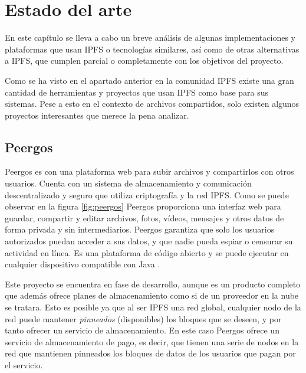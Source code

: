 \chapter{Estado del arte}\label{chap:3estadodelarte}

En este capítulo se lleva a cabo un breve análisis de algunas implementaciones y plataformas que usan IPFS o tecnologías
similares, así como de otras alternativas a IPFS, que cumplen parcial o completamente con los objetivos del proyecto.

Como se ha visto en el apartado anterior en la comunidad IPFS existe una gran cantidad de herramientas y proyectos
que usan IPFS como base para sus sistemas. Pese a esto en el contexto de archivos compartidos, solo existen
algunos proyectos interesantes que merece la pena analizar.

\section{Peergos}

Peergos es con una plataforma web para subir archivos y compartirlos con otros usuarios. Cuenta con un sistema de
almacenamiento y comunicación descentralizado y seguro que utiliza criptografía y la red IPFS. Como se puede observar en la
figura \ref{fig:peergos} Peergos proporciona una interfaz web para guardar,
compartir y editar archivos, fotos, vídeos, mensajes y otros datos de forma privada y sin intermediarios. Peergos garantiza que
solo los usuarios autorizados puedan acceder a sus datos, y que nadie pueda espiar o censurar su actividad en línea. Es una
plataforma de código abierto y se puede ejecutar en cualquier dispositivo compatible con Java \cite{PeergosPeergosP2p}.

Este proyecto se encuentra en fase de desarrollo, aunque es un producto completo que además ofrece planes de almacenamiento
como si de un proveedor en la nube se tratara. Esto es posible ya que al ser IPFS una red global,
cualquier nodo de la red puede mantener \textit{pinneados} (disponibles) los bloques que se deseen, y por tanto
ofrecer un servicio de almacenamiento. En este caso Peergos ofrece un servicio de almacenamiento de pago, es decir,
que tienen una serie de nodos en la red que mantienen pinneados los bloques de datos de los usuarios que pagan por el servicio.

